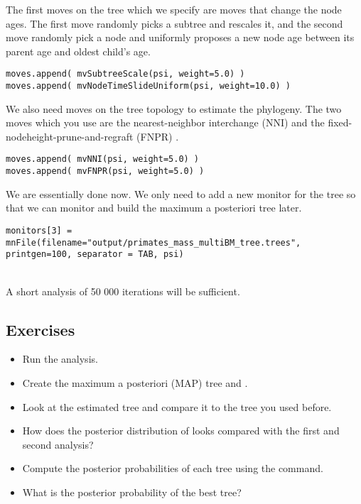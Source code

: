 The first moves on the tree which we specify are moves that change the node ages. The first move randomly picks a subtree and rescales it, and the second move randomly pick a node and uniformly proposes a new node age between its parent age and oldest child's age.
{\tt \small \begin{snugshade*}
\begin{lstlisting}
moves.append( mvSubtreeScale(psi, weight=5.0) )
moves.append( mvNodeTimeSlideUniform(psi, weight=10.0) )
\end{lstlisting}
\end{snugshade*}}

We also need moves on the tree topology to estimate the phylogeny. The two moves which you use are the nearest-neighbor interchange (NNI) and the fixed-nodeheight-prune-and-regraft (FNPR) \citep{Hohna2012}.
{\tt \small \begin{snugshade*}
\begin{lstlisting}
moves.append( mvNNI(psi, weight=5.0) )
moves.append( mvFNPR(psi, weight=5.0) )\end{lstlisting}
\end{snugshade*}}
We are essentially done now. We  only need to add a new monitor for the tree so that we can monitor and build the maximum a posteriori tree later.
{\tt \small \begin{snugshade*}
\begin{lstlisting}
monitors[3] = mnFile(filename="output/primates_mass_multiBM_tree.trees", printgen=100, separator = TAB, psi)
\end{lstlisting}
\end{snugshade*}}

\noindent \\ \impmark A short analysis of 50 000 iterations will be sufficient.


\subsection*{Exercises}

\begin{itemize}
\item
Run the analysis.
\item
Create the maximum a posteriori (MAP) tree  and .
\item
Look at the estimated tree and compare it to the tree you used before.
\item 
How does the posterior distribution of  looks compared with the first and second analysis?
\item
Compute the posterior probabilities of each tree using the  command.
\item
What is the posterior probability of the best tree?
\end{itemize}

